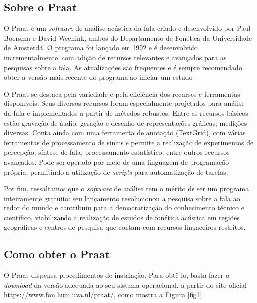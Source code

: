 \documentclass[portuguese]{textolivre}
\begin{document}
\subsection{Sobre o Praat}\label{sec-sobre}
O Praat é um \textit{software} de análise acústica da fala criado e desenvolvido por Paul Boersma e David Weenink, ambos do Departamento de Fonética da Universidade de Amsterdã. O programa foi lançado em 1992 e é desenvolvido incrementalmente, com adição de recursos relevantes e avançados para as pesquisas sobre a fala. As atualizações são frequentes e é sempre recomendado obter a versão mais recente do programa ao iniciar um estudo. 

O Praat se destaca pela variedade e pela eficiência dos recursos e ferramentas disponíveis. Seus diversos recursos foram especialmente projetados para análise da fala e implementados a partir de métodos robustos. Entre os recursos básicos estão gravação de áudio; geração e desenho de representações gráficas; medições diversas. Conta ainda com uma ferramenta de anotação (TextGrid), com várias ferramentas de processamento de sinais e permite a realização de experimentos de percepção, síntese de fala, processamento estatístico, entre outros recursos avançados. Pode ser operado por meio de uma linguagem de programação própria, permitindo a utilização de \textit{scripts} para automatização de tarefas.

Por fim, ressaltamos que o \textit{software} de análise tem o mérito de ser um programa inteiramente gratuito: seu lançamento revolucionou a pesquisa sobre a fala ao redor do mundo e contribuiu para a democratização do conhecimento técnico e científico, viabilizando a realização de estudos de fonética acústica em regiões geográficas e centros de pesquisa que contam com recursos financeiros restritos.

\subsection{Como obter o Praat}\label{sec-como}
O Praat dispensa procedimentos de instalação. Para obtê-lo, basta fazer o \textit{download} da versão adequada ao seu sistema operacional, a partir do site oficial \url{https://www.fon.hum.uva.nl/praat/}, como mostra a Figura \ref{fig1}.
\end{document}
